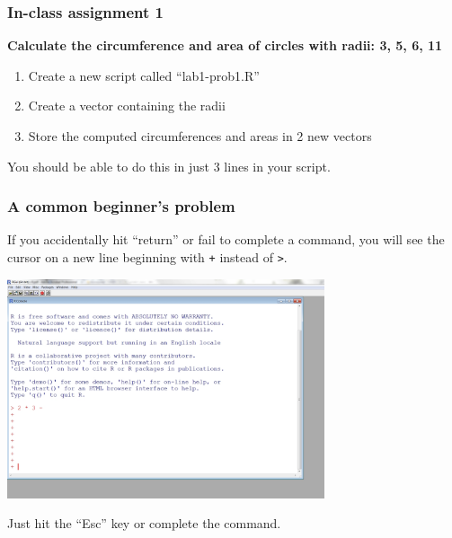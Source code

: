 \documentclass[color=usenames,dvipsnames]{beamer}\usepackage[]{graphicx}\usepackage[]{color}
\begin{document}
\begin{frame}
  \frametitle{In-class assignment 1}
  {\bf Calculate the circumference and area of circles with radii: 3, 5, 6, 11} \\
  \pause
  \vspace{0.5cm}
  \begin{enumerate}[\bf (1)]
    \item Create a new script called ``lab1-prob1.R''
    \item Create a vector containing the radii
    \item Store the computed circumferences and areas in 2 new vectors
  \end{enumerate}
  \vspace{1cm}
  \alert{You should be able to do this in just 3 lines in your script.}
\end{frame}




\begin{frame}[fragile]
  \frametitle{A common beginner's problem}
  If you accidentally hit ``return'' or fail to complete a command, you
  will see the cursor on a new line beginning with \verb_+_ instead of
  \verb+>+. \\
  \pause
  \begin{center}
    \includegraphics[width=0.7\textwidth]{figs/plus-prompt}
  \end{center}
  \pause
  Just hit the ``Esc'' key or complete the command.
\end{frame}
\end{document}
